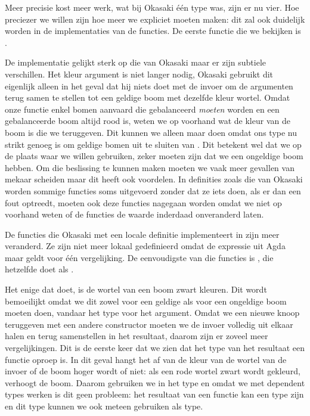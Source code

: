 
Meer precisie kost meer werk, wat bij Okasaki één type was, zijn er nu vier.
Hoe preciezer we willen zijn hoe meer we expliciet moeten maken: dit zal ook
duidelijk worden in de implementaties van de functies. De eerste functie die we
bekijken is .


De implementatie gelijkt sterk op die van Okasaki maar er zijn subtiele
verschillen. Het kleur argument is niet langer nodig, Okasaki gebruikt dit
eigenlijk alleen in het geval dat hij niets doet met de invoer om de argumenten
terug samen te stellen tot een geldige boom met dezelfde kleur wortel. Omdat
onze functie enkel bomen aanvaard die gebalanceerd \emph{moeten} worden en een
gebalanceerde boom altijd rood is, weten we op voorhand wat de kleur van de
boom is die we teruggeven. Dit kunnen we alleen maar doen omdat ons type nu
strikt genoeg is om geldige bomen uit te sluiten van . Dit
betekent wel dat we op de plaats waar we  willen gebruiken,
zeker moeten zijn dat we een ongeldige boom hebben. Om die beslissing te kunnen
maken moeten we vaak meer gevallen van mekaar scheiden maar dit heeft ook
voordelen. In definities zoals die van Okasaki worden sommige functies soms
uitgevoerd zonder dat ze iets doen, als er dan een fout optreedt, moeten ook
deze functies nagegaan worden omdat we niet op voorhand weten of de functies de
waarde inderdaad onveranderd laten.

De functies die Okasaki met een locale definitie implementeert in
 zijn meer veranderd. Ze zijn niet meer lokaal gedefinieerd omdat
de  expressie uit Agda maar geldt voor één vergelijking. De
eenvoudigste van die functies is , die hetzelfde doet als
.


Het enige dat  doet, is de wortel van een boom zwart kleuren.
Dit wordt bemoeilijkt omdat we dit zowel voor een geldige als voor een
ongeldige boom moeten doen, vandaar het type  voor het argument.
Omdat we een nieuwe knoop teruggeven met een andere constructor moeten we de
invoer volledig uit elkaar halen en terug samenstellen in het resultaat, daarom
zijn er zoveel meer vergelijkingen. Dit is de eerste keer dat we zien dat het
type van het resultaat een functie oproep is. In dit geval hangt het af van de
kleur van de wortel van de invoer of de boom hoger wordt of niet: als een rode
wortel zwart wordt gekleurd, verhoogt de boom. Daarom gebruiken we
 in het type en omdat we met dependent types werken is dit
geen probleem: het resultaat van een functie kan een type zijn en dit type
kunnen we ook meteen gebruiken als type.

